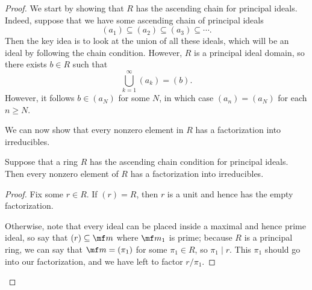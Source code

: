 \begin{proof}
	We start by showing that $R$ has the ascending chain for principal ideals. Indeed, suppose that we have some ascending chain of principal ideals
	\[(a_1)\subseteq (a_2)\subseteq(a_3)\subseteq\cdots.\]
	Then the key idea is to look at the union of all these ideals, which will be an ideal by following the chain condition. However, $R$ is a principal ideal domain, so there exists $b\in R$ such that
	\[\bigcup_{k=1}^\infty(a_k)=(b).\]
	However, it follows $b\in(a_N)$ for some $N$, in which case $(a_n)=(a_N)$ for each $n\ge N$.

	We can now show that every nonzero element in $R$ has a factorization into irreducibles.
	\begin{lemma} \label{lem:factexist}
		Suppose that a ring $R$ has the ascending chain condition for principal ideals. Then every nonzero element of $R$ has a factorization into irreducibles.
	\end{lemma}
	\begin{proof}
		Fix some $r\in R$. If $(r)=R$, then $r$ is a unit and hence has the empty factorization.
	
		Otherwise, note that every ideal can be placed inside a maximal and hence prime ideal, so say that $(r)\subseteq\mf m$ where $\mf m_1$ is prime; because $R$ is a principal ring, we can say that $\mf m=(\pi_1)$ for some $\pi_1\in R$, so $\pi_1\mid r$. This $\pi_1$ should go into our factorization, and we have left to factor $r/\pi_1$.


\end{proof}
\end{proof}
